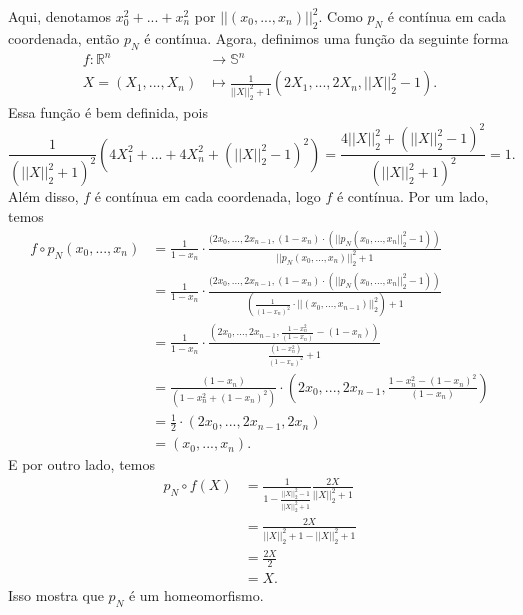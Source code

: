 \begin{dem}
    Aqui, denotamos $x_0^2+...+x_n^2$ por $||(x_0,...,x_n)||_2^2$. Como $p_N$ é contínua em cada coordenada, então $p_N$ é contínua. Agora, definimos uma função da seguinte forma 
    \begin{align*}
        f:\mathbb{R}^n&\longrightarrow \mathbb{S}^n\\
        X=(X_1,...,X_n)&\longmapsto \frac{1}{||X||_2^2+1}(2X_1,...,2X_{n},||X||_2^2-1).
    \end{align*}
    Essa função é bem definida, pois 
    \[\frac{1}{(||X||_2^2+1)^2}(4X_1^2+...+4X_n^2+(||X||_2^2-1)^2)=\frac{4||X||_2^2+(||X||_2^2-1)^2}{(||X||_2^2+1)^2}=1.\]
    Além disso, $f$ é contínua em cada coordenada, logo $f$ é contínua. Por um lado, temos 
    \begin{align*}
        f\circ p_N(x_0,...,x_n)&=\frac{1}{1-x_n}\cdot \frac{(2x_0,...,2x_{n-1},(1-x_n)\cdot(||p_N(x_0,...,x_{n}||_2^2-1))}{||p_N(x_0,...,x_n)||_2^2+1}\\
        &=\frac{1}{1-x_n}\cdot\frac{(2x_0,...,2x_{n-1},(1-x_n)\cdot(||p_N(x_0,...,x_{n}||_2^2-1))}{(\frac{1}{(1-x_n)^2}\cdot ||(x_0,...,x_{n-1})||_2^2)+1}\\
        &=\frac{1}{1-x_n}\cdot\frac{(2x_0,...,2x_{n-1},\frac{1-x_n^2}{(1-x_n)}-(1-x_n))}{\frac{(1-x_n^2)}{(1-x_n)^2}+1}\\
        &=\frac{(1-x_n)}{(1-x_n^2+(1-x_n)^2)}\cdot(2x_0,...,2x_{n-1},\frac{1-x_n^2-(1-x_n)^2}{(1-x_n)})\\
        &=\frac{1}{2}\cdot(2x_0,...,2x_{n-1},2x_n)\\
        &=(x_0,...,x_n).
    \end{align*}
    E por outro lado, temos 
    \begin{align*}
        p_N\circ f(X)&=\frac{1}{1-\frac{||X||_2^2-1}{||X||_2^2+1}}\frac{2X}{||X||_2^2+1}\\
        &=\frac{2X}{||X||_2^2+1-||X||_2^2+1}\\
        &=\frac{2X}{2}\\
        &=X.
    \end{align*}
    Isso mostra que $p_N$ é um homeomorfismo.
\end{dem}

